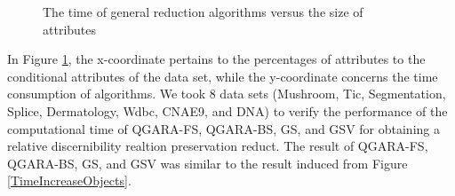 \documentclass[review]{elsarticle}
\begin{document}
\begin{figure}[htbp]
{			}
			\caption{The time of general reduction algorithms versus the size of attributes} 
			\label{TimeIncreaseAttributes}
		\end{figure}
		\par In Figure \ref{TimeIncreaseAttributes}, the x-coordinate pertains to the percentages of attributes to the conditional attributes of the data set, while the y-coordinate concerns the time consumption of algorithms. We took 8 data sets (Mushroom, Tic, Segmentation, Splice, Dermatology, Wdbc, CNAE9, and DNA) to verify the performance of the computational time of QGARA-FS, QGARA-BS, GS, and GSV for obtaining a relative discernibility realtion preservation reduct. The result of QGARA-FS, QGARA-BS, GS, and GSV was similar to the result induced from Figure \ref{TimeIncreaseObjects}.
	
\end{document}
